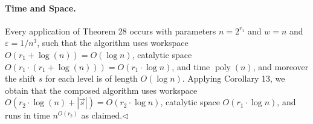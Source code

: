 \paragraph{Time and Space.} Every application of Theorem 28 occurs with parameters $n=2^{r_1}$ and $w=n$ and $\varepsilon=1/n^3$, such that the algorithm uses workspace $O(r_1+\log(n))=O(\log n)$, catalytic space $O(r_1\cdot(r_1+\log(n)))=O(r_1\cdot\log n)$, and time $\operatorname{poly}(n)$, and moreover the shift $s$ for each level is of length $O(\log n)$. Applying Corollary 13, we obtain that the composed algorithm uses workspace $O(r_2\cdot\log(n)+|\vec s|)=O(r_2\cdot\log n)$, catalytic space $O(r_1\cdot\log n)$, and runs in time $n^{O(r_2)}$ as claimed.\hfill$\triangleleft$
